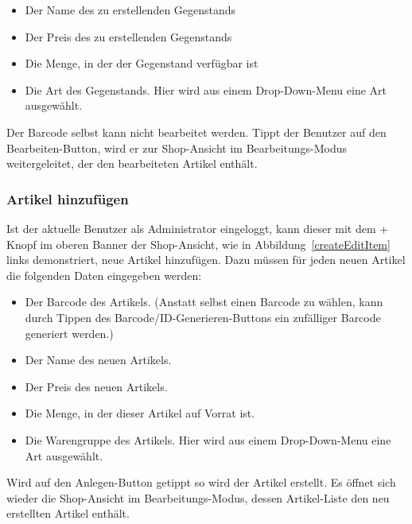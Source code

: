 \begin{itemize}
	\item Der Name des zu erstellenden Gegenstands

	\item Der Preis des zu erstellenden Gegenstands

	\item Die Menge, in der der Gegenstand verfügbar ist

	\item Die Art des Gegenstands.
	Hier wird aus einem Drop-Down-Menu eine Art ausgewählt.
\end{itemize}

Der Barcode selbst kann nicht bearbeitet werden.
Tippt der Benutzer auf den Bearbeiten-Button, wird er zur Shop-Ansicht im Bearbeitungs-Modus weitergeleitet, der den bearbeiteten Artikel enthält.


\subsubsection{Artikel hinzufügen} \label{subsubsec:shop-add-items}

Ist der aktuelle Benutzer als Administrator eingeloggt, kann dieser mit dem + Knopf im oberen Banner der Shop-Ansicht, wie in Abbildung~\ref{createEditItem} links demonstriert, neue Artikel hinzufügen.
Dazu müssen für jeden neuen Artikel die folgenden Daten eingegeben werden:

\begin{itemize}
	\item Der Barcode des Artikels. (Anstatt selbst einen Barcode zu wählen, kann durch Tippen des Barcode/ID-Generieren-Buttons ein zufälliger Barcode generiert werden.)

	\item Der Name des neuen Artikels.

	\item Der Preis des neuen Artikels.

	\item Die Menge, in der dieser Artikel auf Vorrat ist.

	\item Die Warengruppe des Artikels.
	Hier wird aus einem Drop-Down-Menu eine Art ausgewählt.
\end{itemize}

Wird auf den Anlegen-Button getippt so wird der Artikel erstellt.
Es öffnet sich wieder die Shop-Ansicht im Bearbeitungs-Modus, dessen Artikel-Liste den neu erstellten Artikel enthält.

